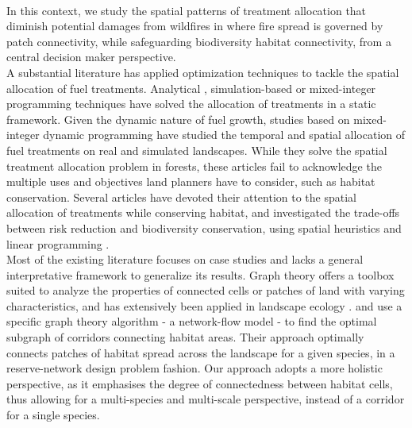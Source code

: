 \\
\hspace*{1.5em}In this context, we study the spatial patterns of treatment allocation that diminish potential damages from wildfires in where fire spread is governed by patch connectivity, while safeguarding biodiversity habitat connectivity, from a central decision maker perspective.  
\\
\hspace*{1.5em}A substantial literature has applied optimization techniques to tackle the spatial allocation of fuel treatments. Analytical \citep{finney_design_2001}, simulation-based \citep{finney_computational_2007, rytwinski_simulation-optimization_2010} or mixed-integer programming techniques \citep{wei_optimization_2008} have solved the allocation of treatments in a static framework. Given the dynamic nature of fuel growth, studies based on mixed-integer dynamic programming \citep{wei_optimization_2008, minas_spatial_2014, rachmawati_model_2015, rachmawati_optimisation_2016} have studied the temporal and spatial allocation of fuel treatments on real and simulated landscapes. While they solve the spatial treatment allocation problem in forests, these articles fail to acknowledge the multiple uses and objectives land planners have to consider, such as habitat conservation. Several articles have devoted their attention to the spatial allocation of treatments while conserving habitat, and investigated the trade-offs between risk reduction and biodiversity conservation, using spatial heuristics \citep{calkin_modeling_2005, lehmkuhl_seeing_2007} and linear programming \citep{Williams2017, rachmawati_fuel_2018}.\\
Most of the existing literature focuses on case studies and lacks a general interpretative framework to generalize its results. Graph theory offers a toolbox suited to analyze the properties of connected cells or patches of land with varying characteristics, and has extensively been applied in landscape ecology \citep{urban_landscape_2001, minor_graph-theory_2008, rayfield_multipurpose_2016}. \cite{conrad_wildlife_2012} and \cite{jafari_new_2013} use a specific graph theory algorithm - a network-flow model - to find the optimal subgraph of corridors connecting habitat areas. Their approach optimally connects patches of habitat spread across the landscape for a given species, in a reserve-network design problem fashion. Our approach adopts a more holistic perspective, as it emphasises the degree of connectedness between habitat cells, thus allowing for a multi-species and multi-scale perspective, instead of a corridor for a single species.  
